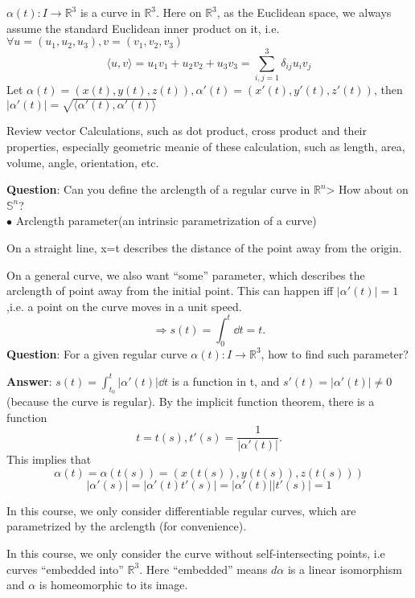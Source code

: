  
$\alpha(t)\colon I\to \mathbb{R}^3$ is a curve in $\mathbb{R}^3$. Here on $\mathbb{R}^3$, as the Euclidean space, we always assume the standard Euclidean inner product on it, i.e. $\forall u=(u_1,u_2,u_3),v=(v_1,v_2,v_3)$
\[\langle u,v\rangle=u_1 v_1+u_2 v_2+ u_3 v_3=\sum_{i,j=1}^3\delta_{ij}u_i v_j\]
Let $\alpha(t)=(x(t),y(t),z(t)),\alpha'(t)=(x'(t),y'(t),z'(t))$, then $\left|\alpha'(t)\right|=\sqrt{\langle\alpha'(t),\alpha'(t)\rangle}$
\begin{exer}
    Review vector Calculations, such as dot product, cross product and their properties, especially geometric meanie of these calculation, such as length, area, volume, angle, orientation, etc.
\end{exer}
\noindent
\textbf{Question}: Can you define the arclength of a regular curve in $\mathbb{R}^n$> How about on $\mathbb{S}^n$? \\
$\bullet$ Arclength parameter(an intrinsic parametrization of a curve)
\begin{exam}
On a straight line, x=t describes the distance of the point away from the origin.
\begin{center}
\end{center}
\end{exam}
On a general curve, we also want ``some'' parameter, which describes the arclength of point away from the initial point. This can happen iff $|\alpha'(t)|=1$,i.e. a point on the curve moves in a unit speed.
\[\Rightarrow s(t)=\int_0^t \dd t=t.\]
\textbf{Question}: For a given regular curve $\alpha(t)\colon I\to \mathbb{R}^3$, how to find such parameter?

\noindent 
\textbf{Answer}: $s(t)=\int_{t_0}^t \left|\alpha'(t)\right|\dd t$ is a function in t, and $s'(t)=\left|\alpha'(t)\right|\neq 0$(because the curve is regular). By the implicit function theorem, there is a function 
\[
    t=t(s),t'(s)=\frac{1}{\left|\alpha'(t)\right|}.
\]
This implies that 
\[
    \alpha(t)=\alpha(t(s))=(x(t(s)),y(t(s)),z(t(s)))
\]
\[
    \left|\alpha'(s)\right|=\left|\alpha'(t)t'(s)\right|=\left|\alpha'(t)\right|\left|t'(s)\right|=1
\]

 In this course, we only consider differentiable regular curves, which are parametrized by the arclength (for convenience).
\begin{remark}
    In this course, we only consider the curve without self-intersecting points, i.e curves ``embedded into'' $\mathbb{R}^3$. Here ``embedded'' means $d\alpha$ is a linear isomorphism and $\alpha$ is homeomorphic to its image.
\end{remark}
